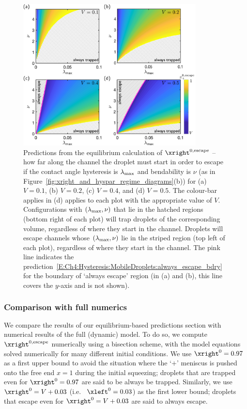 \begin{figure}[h!]
\centering
\includegraphics[width = 0.84\textwidth]{nu_dt_regime_diags_diffV}
\caption{Predictions from the equilibrium calculation of  $\xright^{0,\text{escape}}$ -- how far along the channel the droplet must start in order to escape if the contact angle hysteresis is $\lambda_{\text{max}}$ and bendability is $\nu$ (as in Figure~\ref{fig:xright_and_hyspar_regime_diagrams}(b)) for (a) $V = 0.1$, (b) $V = 0.2$, (c) $V = 0.4$, and (d) $V = 0.5$. The colour-bar applies in (d) applies to each plot with the appropriate value of $V$.  Configurations with $(\lambda_{\text{max}}, \nu)$ that lie in the hatched regions (bottom right of each plot) will trap droplets of the corresponding volume, regardless of where they start in the channel. Droplets will escape channels whose $(\lambda_{\text{max}}, \nu)$ lie in the striped region (top left of each plot), regardless of where they start in the channel. The pink line indicates the prediction~\eqref{E:Ch4:Hysteresis:MobileDroplets:always_escape_bdry} for the boundary of `always escape' region (in (a) and (b), this line covers the $y$-axis and is not shown).}\label{fig:Ch4:Hysteresis:nu_dt_variousV}
\end{figure}

%
\subsubsection{Comparison with full numerics}
We compare the results of our equilibrium-based predictions section with numerical results of the full (dynamic) model. To do so, we compute $\xright^{0,\text{escape}}$ numerically using a bisection scheme, with the model equations solved numerically for many different initial conditions. We use $\xright^0 = 0.97$ as a first upper bound to avoid the situation where the `$+$' meniscus is pushed onto the free end $x = 1$ during the initial squeezing; droplets that are trapped even for $\xright^0 = 0.97$ are said to be always be trapped. Similarly, we use $\xright^0 = V + 0.03$ (i.e.~ $\xleft^0 = 0.03$) as the first lower bound; droplets that escape even for $\xright^0 = V + 0.03$ are said to always escape.

